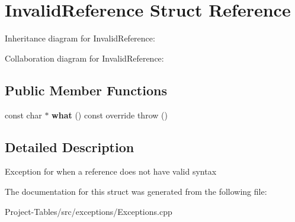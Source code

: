 \hypertarget{structInvalidReference}{}\section{Invalid\+Reference Struct Reference}
\label{structInvalidReference}


Inheritance diagram for Invalid\+Reference\+:


Collaboration diagram for Invalid\+Reference\+:
\subsection*{Public Member Functions}
\begin{DoxyCompactItemize}
\item 
\mbox{\label{structInvalidReference_a4ee649a5d0cbc9a0066821a17935ea80}} 
const char $\ast$ {\bfseries what} () const override  throw ()
\end{DoxyCompactItemize}


\subsection{Detailed Description}
Exception for when a reference does not have valid syntax 

The documentation for this struct was generated from the following file\+:\begin{DoxyCompactItemize}
\item 
Project-\/\+Tables/src/exceptions/Exceptions.\+cpp\end{DoxyCompactItemize}
